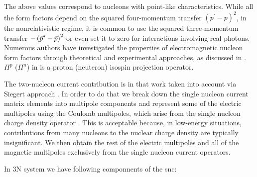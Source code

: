     The above values correspond to nucleons with point-like characteristics. While all the form factors depend on the squared
    four-momentum transfer $\left(p^{\prime}-p\right)^2$, in the nonrelativistic regime, it is common to use the squared
    three-momentum transfer $-\left(\pvec{p}-\vec{p}\right)^2$ or even set it to zero for interactions involving
    real photons. Numerous authors have investigated the properties of electromagnetic nucleon form factors through
    theoretical and experimental approaches, as discussed in \cite{Arrington_2007, JOURDAN1999513c}.
    $\Pi^p$ ($\Pi^n$) in  is a proton (neuteron) isospin projection operator.

    The two-nucleon current contribution is in that work taken into account via Siegert approach \cite{Siegert, GolakKamad2000_ExplDescr, Golak2005}.
    In order to do that we break down the single nucleon current matrix elements into multipole components and 
    represent some of the electric multipoles using the Coulomb multipoles,
    which arise from the single nucleon charge density operator \cite{Golak2005}.
    This is acceptable because, in low-energy situations, contributions from many nucleons to the nuclear charge density are typically insignificant.
    We then obtain the rest of the electric multipoles and all of the magnetic multipoles exclusively from the single nucleon current operators.

    In 3N system we have following componnents of the \gls{snc}:

